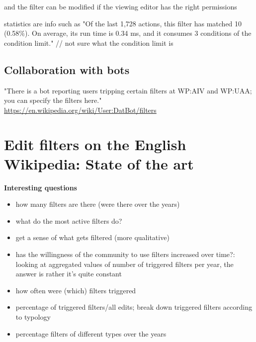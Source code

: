 \documentclass{sigchi}
\begin{document}
and the filter can be modified if the viewing editor has the right permissions

statistics are info such as "Of the last 1,728 actions, this filter has matched 10 (0.58\%). On average, its run time is 0.34 ms, and it consumes 3 conditions of the condition limit." // not sure what the condition limit is

\subsection{Collaboration with bots}

"There is a bot reporting users tripping certain filters at WP:AIV and WP:UAA; you can specify the filters here."
\url{https://en.wikipedia.org/wiki/User:DatBot/filters}

\section{Edit filters on the English Wikipedia: State of the art}

\textbf{Interesting questions}
\begin{itemize}
    \item how many filters are there (were there over the years)
    \item what do the most active filters do?
    \item get a sense of what gets filtered (more qualitative)
    \item has the willingness of the community to use filters increased over time?: looking at aggregated values of number of triggered filters per year, the answer is rather it's quite constant
    \item how often were (which) filters triggered
    \item percentage of triggered filters/all edits; break down triggered filters according to typology
    \item percentage filters of different types over the years
\end{itemize}
\end{document}
